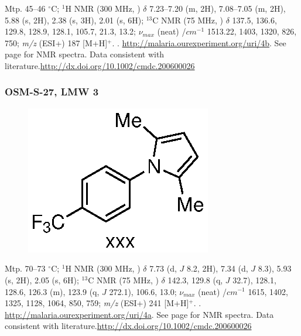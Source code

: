 \documentclass[12pt, a4paper,titlepage]{article}
\begin{document}
Mtp. 45--46 $^\circ$C;
$^1$H NMR (300 MHz, ) $\delta$ 7.23--7.20 (m, 2H), 7.08--7.05 (m, 2H), 5.88 (s, 2H), 2.38 (s, 3H), 2.01 (s, 6H);
$^{13}$C NMR (75 MHz, ) $\delta$ 137.5, 136.6, 129.8, 128.9, 128.1, 105.7, 21.3, 13.2;
 $\nu_{max}$ (neat) /$cm^{-1}$ 1513.22, 1403, 1320, 826, 750;
\emph{m/z} (ESI+) 187 [M+H]$^+$.
.
\url{http://malaria.ourexperiment.org/uri/4b}.
 See page \pageref{spec:LMW2} for NMR spectra. Data consistent with literature.\url{http://dx.doi.org/10.1002/cmdc.200600026}


\subsubsection*{OSM-S-27, LMW 3}
\label{exp:LMW3}
	\begin{figure}[H]
	\begin{center}
	\includegraphics{exp/LMW3.eps}
	\end{center}
	\vspace{-25pt}	
	\end{figure}	

Mtp. 70--73 $^\circ$C;
$^1$H NMR (300 MHz, ) $\delta$ 7.73 (d, $J$ 8.2, 2H), 7.34 (d, $J$ 8.3), 5.93 (s, 2H), 2.05 (s, 6H); 
$^{13}$C NMR (75 MHz, ) $\delta$  142.3, 129.8 (q, $J$ 32.7), 128.1, 128.6, 126.3 (m), 123.9 (q, $J$ 272.1), 106.6, 13.0;
 $\nu_{max}$ (neat) /$cm^{-1}$ 1615, 1402, 1325, 1128, 1064, 850, 759;
\emph{m/z} (ESI+) 241 [M+H]$^+$.
.
\url{http://malaria.ourexperiment.org/uri/4a}.
 See page \pageref{spec:LMW2} for NMR spectra. Data consistent with literature.\url{http://dx.doi.org/10.1002/cmdc.200600026}
\end{document}
